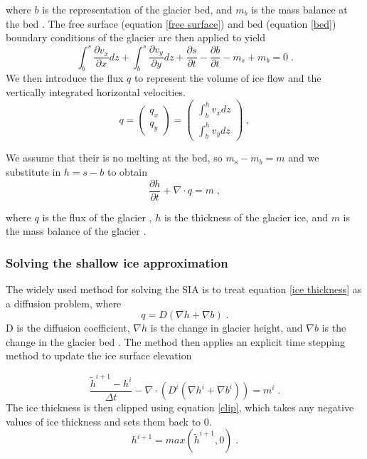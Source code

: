 \documentclass{article}
\begin{document}
where $b$ is the representation of the glacier bed, and $m_b$ is the mass balance at the bed \citep{LEMEUR2004, Greve2009}. The free surface (equation \ref{free surface}) and bed (equation \ref{bed}) boundary conditions of the glacier are then applied to yield
\begin{equation}
    \int_b^s \frac{\partial v_x}{\partial x}dz+\int_b^s \frac{\partial v_y}{\partial y}dz+ \frac{\partial s}{\partial t}-\frac{\partial b}{\partial t} -m_s+m_b = 0 \; .
\end{equation}
We then introduce the flux $q$ to represent the volume of ice flow and the vertically integrated horizontal velocities. 
\begin{equation}
q= \begin{pmatrix}
q_x \\
q_y
\end{pmatrix} = \begin{pmatrix}
\int_b^h v_x dz\\
\int_b^h v_y dz
\end{pmatrix} \; ,
\end{equation}

We assume that their is no melting at the bed, so $m_s-m_b=m$ and we substitute in $h = s-b$ to obtain
\begin{equation}\label{ice thickness}
\frac{\partial h}{\partial t} + \nabla \cdot q = m \; ,
\end{equation}


where $q$ is the flux of the glacier , $h$ is the thickness of the glacier ice, and $m$ is the mass balance of the glacier \citep{Jarosch2013,Greve2009}.


\subsubsection{Solving the shallow ice approximation}
The widely used method for solving the SIA is to treat equation \ref{ice thickness} as a diffusion problem, where 
\begin{equation} \label{diffusion1}
    q= D(\nabla h + \nabla b) \; .
\end{equation}
D is the diffusion coefficient, $\nabla h$ is the change in glacier height, and $\nabla b$ is the change in the glacier bed  \citep{Jarosch2013}. The method then applies an explicit time stepping method to update the ice surface elevation

\begin{equation} \label{timestep}
\frac{\tilde{h}^{i+1}-h^i}{\Delta t} - \nabla \cdot (D^i (\nabla h^{i} + \nabla b^{i})) = m^i \; .
\end{equation}
The ice thickness is then clipped using equation \ref{clip}, which takes any negative values of ice thickness and sets them back to 0. 
\begin{equation}\label{clip}
h^{i+1}=max(\tilde{h}^{i+1},0) \; .
\end{equation}
\end{document}
